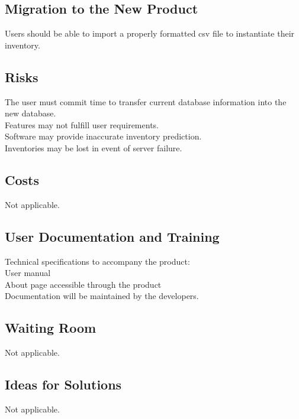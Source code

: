 \documentclass[12pt, titlepage]{article}
\begin{document}
\subsection{Migration to the New Product}
Users should be able to import a properly formatted csv file to instantiate their inventory.\\

\subsection{Risks}
The user must commit time to transfer current database information into the new database.\\
Features may not fulfill user requirements.\\
Software may provide inaccurate inventory prediction.\\
Inventories may be lost in event of server failure.\\


\subsection{Costs}
Not applicable.
\subsection{User Documentation and Training}
Technical specifications to accompany the product:\\
User manual\\
About page accessible through the product\\
Documentation will be maintained by the developers.\\

\subsection{Waiting Room}
Not applicable.

\subsection{Ideas for Solutions} %
Not applicable. 
\end{document}
